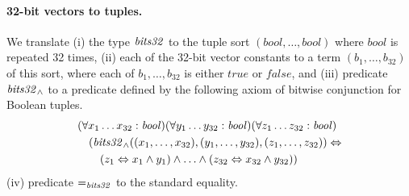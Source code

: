 \paragraph{32-bit vectors to tuples.}
We translate
(i) the type $\mathit{bits32}$ to the tuple sort $(\mathit{bool},\ldots,\mathit{bool})$ where $\mathit{bool}$ is repeated 32 times,
(ii) each of the 32-bit vector constants to a term $(b_1,\ldots,b_{32})$ of this sort, where each of $b_1,\ldots,b_{32}$ is either $\mathit{true}$ or $\mathit{false}$, and
(iii) predicate $\mathit{bits32}_\wedge$ to a predicate defined by the following axiom of bitwise conjunction for Boolean tuples.
\begin{equation*}
\begin{aligned}
&(\forall x_1\ldots x_{32}:\mathit{bool})(\forall y_1\ldots y_{32}:\mathit{bool})(\forall z_1\ldots z_{32}:\mathit{bool})\\
&\quad(\mathit{bits32}_\wedge((x_1,\ldots,x_{32}),(y_1,\ldots,y_{32}),(z_1,\ldots,z_{32}))\Leftrightarrow\\
&\quad\quad (z_1\Leftrightarrow x_1\wedge y_1)\wedge\ldots\wedge(z_{32}\Leftrightarrow x_{32}\wedge y_{32}))
\end{aligned}
\end{equation*}
(iv) predicate $\mathit{=}_{\mathit{bits32}}$ to the standard equality.

